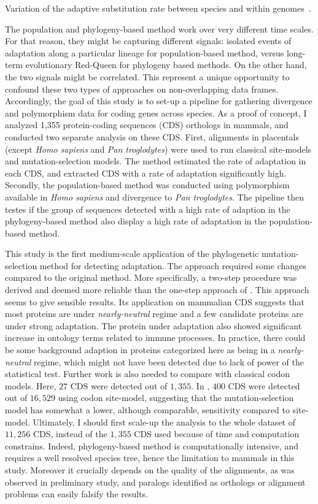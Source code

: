Variation of the adaptive \gls{substitution} rate between species and within genomes~\citep{Moutinho2019a}.

The population and phylogeny-based method work over very different time scales.
For that reason, they might be capturing different signals: isolated events of adaptation along a particular lineage for population-based method, versus long-term evolutionary Red-Queen for phylogeny based methods. On the other hand, the two signals might be correlated. This represent a unique opportunity to confound these two types of approaches on non-overlapping data frames. Accordingly, the goal of this study is to set-up a pipeline for gathering divergence and polymorphism data for coding genes across species. As a proof of concept, I analyzed 1,355 protein-coding sequences (CDS) orthologs in mammals, and conducted two separate analysis on these CDS. First, alignments in placentals (except \textit{Homo sapiens} and \textit{Pan troglodytes}) were used to run classical site-models and mutation-selection models. The method estimated the rate of adaptation in each CDS, and extracted CDS with a rate of adaptation significantly high. Secondly, the population-based method was conducted using polymorphism available in \textit{Homo sapiens} and divergence to \textit{Pan troglodytes}. The pipeline then testes if the group of sequences detected with a high rate of adaption in the phylogeny-based method also display a high rate of adaptation in the population-based method.

This study is the first medium-scale application of the phylogenetic mutation-selection method for detecting adaptation. The approach required some changes compared to the original method. More specifically, a two-step procedure was derived and deemed more reliable than the one-step approach of \citet{Lartillot2013}. This approach seems to give sensible results. Its application on mammalian CDS suggests that most proteins are under \textit{nearly-neutral} regime and a few candidate proteins are under strong adaptation. The protein under adaptation also showed significant increase in ontology terms related to immune processes. In practice, there could be some background adaption in proteins categorized here as being in a \textit{nearly-neutral} regime, which might not have been detected due to lack of power of the statistical test. Further work is also needed to compare with classical \gls{codon} models. Here, $27$ CDS were detected out of $1,355$. In \citet{kosiol_patterns_2008}, $400$ CDS were detected out of $16,529$ using \gls{codon} site-model, suggesting that the mutation-selection model has somewhat a lower, although comparable, sensitivity compared to site-model. Ultimately, I should first scale-up the analysis to the whole dataset of $11,256$ CDS, instead of the $1,355$ CDS used because of time and computation constrains. Indeed, phylogeny-based method is computationally intensive, and requires a well resolved species tree, hence the limitation to mammals in this study. Moreover it crucially depends on the quality of the alignments, as was observed in preliminary study, and paralogs identified as orthologs or alignment problems can easily falsify the results.\\

